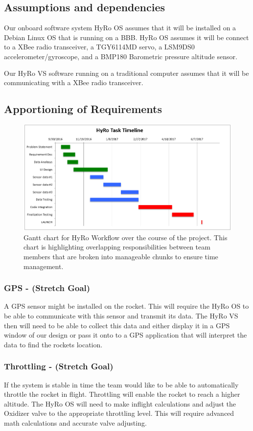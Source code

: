 \documentclass[10pt,draftclsnofoot,onecolumn,compsoc]{IEEEtran}
\begin{document}
\subsection{Assumptions and dependencies}
Our onboard software system HyRo OS assumes that it will be installed on a Debian Linux OS that is running on a BBB.  HyRo OS assumes it will be connect to a XBee radio transceiver, a TGY6114MD servo, a LSM9DS0 accelerometer/gyroscope, and a BMP180 Barometric pressure altitude sensor.\par
	Our HyRo VS software running on a traditional computer assumes that it will be communicating with a XBee radio transceiver.

\subsection{Apportioning of Requirements}
\begin{figure}
  \caption{Gantt chart for HyRo Workflow over the course of the project. This chart is highlighting overlapping responsibilities between team members that are broken into manageable chunks to ensure time management. }
  \centering
	\includegraphics[scale=.75]{GanntChart}
\end{figure}
\FloatBarrier
\subsubsection{\bf GPS - (Stretch Goal)} A GPS sensor might be installed on the rocket. This will require the HyRo OS to be able to communicate with this sensor and transmit its data. The HyRo VS then will need to be able to collect this data and either display it in a GPS window of our design or pass it onto to a GPS application that will interpret the data to find the rockets location.
\subsubsection{\bf Throttling - (Stretch Goal)} If the system is stable in time the team would like to be able to automatically throttle the rocket in flight. Throttling will enable the rocket to reach a higher altitude. The HyRo OS will need to make inflight calculations and adjust the Oxidizer valve to the appropriate throttling level. This will require advanced math calculations and accurate valve adjusting.
\end{document}
